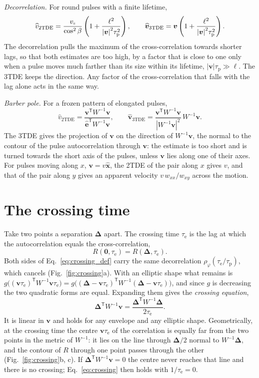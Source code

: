 \documentclass[aps,pre,11pt,a4paper,preprint,amsmath,amssymb,groupedaddress]{revtex4-2}
\newcommand{\Eqref}[1]{Eq.~\eqref{#1}}
\newcommand{\Figref}[1]{Fig.~\ref{#1}}
\newcommand{\wh}{\widehat}
\newcommand{\abs}[1]{{\left|#1\right|}}
\newcommand{\bv}{\ensuremath{\bm{v}}}
\newcommand{\bD}{\ensuremath{\bm{\Delta}}}
\newcommand{\bex}{\ensuremath{\hat{\bm{x}}}}
\newcommand{\be}{\ensuremath{\hat{\bm{e}}}}
\newcommand{\T}{\ensuremath{\mathsf{T}}}
\newcommand{\rphi}{\ensuremath{\rho_\varphi}}
\newcommand{\taud}{\ensuremath{\tau_\text{p}}}
\newcommand{\taue}{\ensuremath{\tau_\text{e}}}
\newcommand{\Wi}{\ensuremath{W^{-1}}}
\newcommand{\w}[1]{\ensuremath{w_{#1}}}
\begin{document}
\emph{Decorrelation.} For round pulses with a finite lifetime,
%
\begin{equation}
\label{eq:decorrelation}
\wh{v}_\text{2TDE} = \frac{v_\shortparallel}{\cos^2\beta} \left( 1 + \frac{\ell^2}{\abs{\bv}^2\taud^2} \right),
\qquad
\wh{\bv}_\text{3TDE} = \bv \left( 1 + \frac{\ell^2}{\abs{\bv}^2\taud^2} \right).
\end{equation}
%
The decorrelation pulls the maximum of the cross-correlation towards shorter lags, so that both estimates are too high, by a factor that is close to one only when a pulse moves much farther than its size within its lifetime, $\abs{\bv}\taud \gg \ell$. The 3TDE keeps the direction. Any factor of the cross-correlation that falls with the lag alone acts in the same way.

\emph{Barber pole.} For a frozen pattern of elongated pulses,
%
\begin{equation}
\label{eq:barberpole}
\wh{v}_\text{2TDE} = \frac{\bv^\T\Wi\bv}{\be^\T\Wi\bv},
\qquad
\wh{\bv}_\text{3TDE} = \frac{\bv^\T\Wi\bv}{\abs{\Wi\bv}^2}\, \Wi\bv.
\end{equation}
%
The 3TDE gives the projection of \bv{} on the direction of $\Wi\bv$, the normal to the contour of the pulse autocorrelation through $\bv$: the estimate is too short and is turned towards the short axis of the pulses, unless \bv{} lies along one of their axes. For pulses moving along $x$, $\bv = v\bex$, the 2TDE of the pair along $x$ gives $v$, and that of the pair along $y$ gives an apparent velocity $v\,\w{xx}/\w{xy}$ across the motion.

\section{The crossing time}
\label{sec:crossing}

Take two points a separation \bD{} apart. The crossing time \taue{} is the lag at which the autocorrelation equals the cross-correlation,
%
\begin{equation}
\label{eq:crossing_def}
R(\bm{0}, \taue) = R(\bD, \taue).
\end{equation}
%
Both sides of \Eqref{eq:crossing_def} carry the same decorrelation $\rphi(\taue/\taud)$, which cancels (\Figref{fig:crossing}a). With an elliptic shape what remains is $g\big((\bv\taue)^\T\Wi\bv\taue\big) = g\big((\bD-\bv\taue)^\T\Wi(\bD-\bv\taue)\big)$, and since $g$ is decreasing the two quadratic forms are equal. Expanding them gives the \emph{crossing equation},
%
\begin{equation}
\label{eq:crossing}
\bD^\T \Wi \bv = \frac{\bD^\T \Wi \bD}{2\taue}.
\end{equation}
%
It is linear in \bv{} and holds for any envelope and any elliptic shape. Geometrically, at the crossing time the centre $\bv\taue$ of the correlation is equally far from the two points in the metric of \Wi: it lies on the line through $\bD/2$ normal to $\Wi\bD$, and the contour of $R$ through one point passes through the other (\Figref{fig:crossing}b, c). If $\bD^\T\Wi\bv = 0$ the centre never reaches that line and there is no crossing; \Eqref{eq:crossing} then holds with $1/\taue = 0$.
\end{document}

